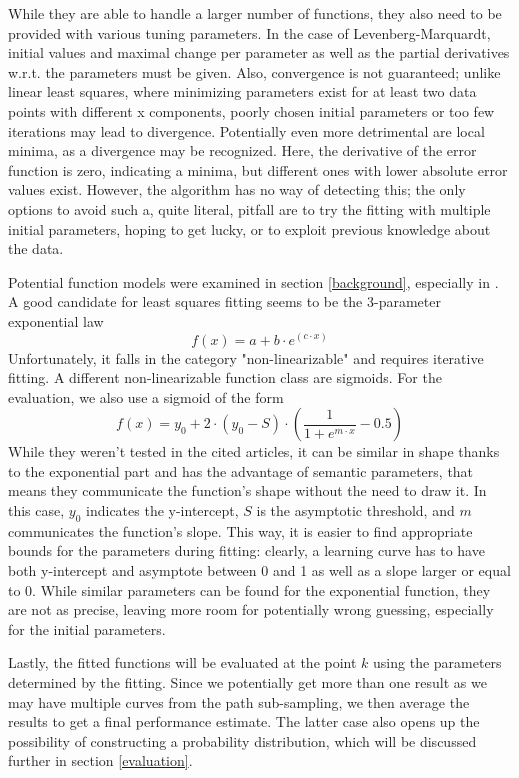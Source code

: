 While they are able to handle a larger number of functions, they also need to be provided with various tuning parameters. In the case of Levenberg-Marquardt, initial values and maximal change per parameter as well as the partial derivatives w.r.t. the parameters must be given. Also, convergence is not guaranteed; unlike linear least squares, where minimizing parameters exist for at least two data points with different x components, poorly chosen initial parameters or too few iterations may lead to divergence. Potentially even more detrimental are local minima, as a divergence may be recognized. Here, the derivative of the error function is zero, indicating a minima, but different ones with lower absolute error values exist. However, the algorithm has no way of detecting this; the only options to avoid such a, quite literal, pitfall are to try the fitting with multiple initial parameters, hoping to get lucky, or to exploit previous knowledge about the data.

Potential function models were examined in section \ref{background}, especially in \cite{Singh2005}. A good candidate for least squares fitting seems to be the 3-parameter exponential law
\begin{equation}
f(x) = a + b \cdot e^(c \cdot x)
\end{equation}
Unfortunately, it falls in the category "non-linearizable" and requires iterative fitting. A different non-linearizable function class are sigmoids. For the evaluation, we also use a sigmoid of the form
\begin{equation}
f(x) = y_0 + 2 \cdot (y_0 - S) \cdot \left( \frac{1}{1+e^{m \cdot x}} - 0.5 \right)
\end{equation}
While they weren't tested in the cited articles, it can be similar in shape thanks to the exponential part and has the advantage of semantic parameters, that means they communicate the function's shape without the need to draw it. In this case, $y_0$ indicates the y-intercept, $S$ is the asymptotic threshold, and $m$ communicates the function's slope. This way, it is easier to find appropriate bounds for the parameters during fitting: clearly, a learning curve has to have both y-intercept and asymptote between 0 and 1 as well as a slope larger or equal to 0. While similar parameters can be found for the exponential function, they are not as precise, leaving more room for potentially wrong guessing, especially for the initial parameters.

Lastly, the fitted functions will be evaluated at the point $k$ using the parameters determined by the fitting. Since we potentially get more than one result as we may have multiple curves from the path sub-sampling, we then average the results to get a final performance estimate. The latter case also opens up the possibility of constructing a probability distribution, which will be discussed further in section \ref{evaluation}.

